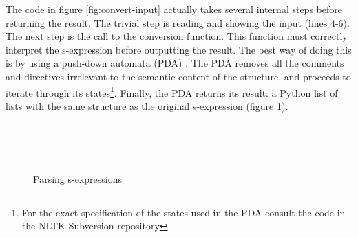 \documentclass[12pt]{article}
\begin{document}
{The code in figure \ref{fig:convert-input} actually takes several internal steps before returning the result. The trivial step is reading
and showing the input (lines 4-6). The next step is the call to the conversion function. This function
must correctly interpret the s-expression before outputting the result. The best way of doing this is by using 
a push-down automata (PDA) \cite{lang-mach}. The PDA removes all the comments and directives 
irrelevant to the semantic content of the structure, and proceeds to iterate through its states\footnote{For the exact specification of the states used in the PDA consult the code in the 
NLTK Subversion repository}. Finally, the PDA returns its result: a Python list of lists with the same
structure as the original s-expression (figure \ref{fig:sexp-parsing}).

\begin{figure}[h!]
    \centering
{\scriptsize
{} \\
 \\
 \\
}
\caption{Parsing s-expressions}
\label{fig:sexp-parsing}
\end{figure}

}
\end{document}
